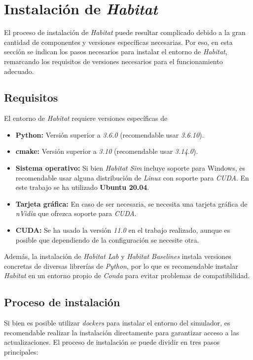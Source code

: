 \section{Instalación de \textit{Habitat}}

El proceso de instalación de \textit{Habitat} puede resultar complicado debido a la gran cantidad de componentes y versiones específicas necesarias. Por eso, en esta sección se indican los pasos necesarios para instalar el entorno de \textit{Habitat}, remarcando los requisitos de versiones necesarios para el funcionamiento adecuado.

\subsection{Requisitos}

El entorno de \textit{Habitat} requiere versiones específicas de 

\begin{itemize}
	\item \textbf{Python:} Versión superior a \textit{3.6.0} (recomendable usar \textit{3.6.10}).
	\item \textbf{cmake:} Versión superior a \textit{3.10} (recomendable usar \textit{3.14.0}).
	\item \textbf{Sistema operativo:} Si bien \textit{Habitat Sim} incluye soporte para Windows, es recomendable usar alguna distribución de \textit{Linux} con soporte para \textit{CUDA}. En este trabajo se ha utilizado \textbf{Ubuntu 20.04}.
	\item \textbf{Tarjeta gráfica:} En caso de ser necesaria, se necesita una tarjeta gráfica de \textit{nVidia} que ofrezca soporte para \textit{CUDA}.
	\item \textbf{CUDA:} Se ha usado la versión \textit{11.0} en el trabajo realizado, aunque es posible que dependiendo de la configuración se necesite otra.
\end{itemize}

Además, la instalación de \textit{Habitat Lab} y \textit{Habitat Baselines} instala versiones concretas de diversas librerías de \textit{Python}, por lo que es recomendable instalar \textit{Habitat} en un entorno propio de \textit{Conda} para evitar problemas de compatibilidad. 

\subsection{Proceso de instalación}

Si bien es posible utilizar \textit{dockers} para instalar el entorno del simulador, es recomendable realizar la instalación directamente para garantizar acceso a las actualizaciones. El proceso de instalación se puede dividir en tres pasos principales:

